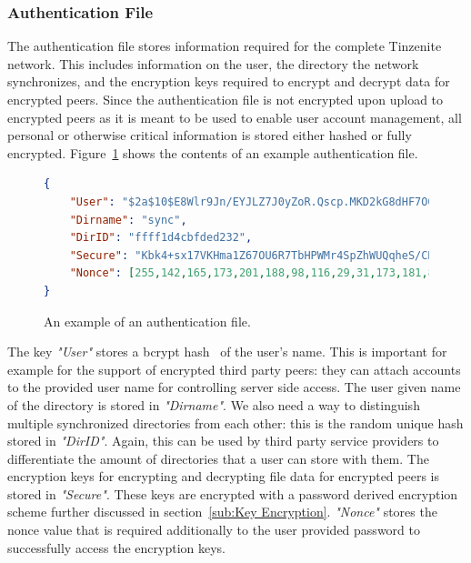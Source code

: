 \subsubsection{Authentication File}
\label{subs:Authentication File}

The authentication file stores information required for the complete Tinzenite network.
This includes information on the user, the directory the network synchronizes, and the encryption keys required to encrypt and decrypt data for encrypted peers.
Since the authentication file is not encrypted upon upload to encrypted peers as it is meant to be used to enable user account management, all personal or otherwise critical information is stored either hashed or fully encrypted.
Figure~\ref{json:auth_object} shows the contents of an example authentication file.

\begin{figure}[htp]
    \begin{lstlisting}[language=json,firstnumber=0]
{
    "User": "$2a$10$E8Wlr9Jn/EYJLZ7J0yZoR.Qscp.MKD2kG8dHF7OQWYNA1mCfp.Qqe",
    "Dirname": "sync",
    "DirID": "ffff1d4cbfded232",
    "Secure": "Kbk4+sx17VKHma1Z67OU6R7TbHPWMr4SpZhWUQqheS/CNcKKHVYjTTSv0rbF4qDAa0vwikigsm7wHhy4iGjWB84i0ErO7rNwhqrPPxudeDM=",
    "Nonce": [255,142,165,173,201,188,98,116,29,31,173,181,84,84,137,54,159,50,193,248,51,162,76,195]
}
    \end{lstlisting}
\caption[Authentication JSON Object]{An example of an authentication file.}
\label{json:auth_object}
\end{figure}

The key \textit{"User"} stores a bcrypt hash~\cite{provos1999future} of the user's name.
This is important for example for the support of encrypted third party peers: they can attach accounts to the provided user name for controlling server side access.
The user given name of the directory is stored in \textit{"Dirname"}.
We also need a way to distinguish multiple synchronized directories from each other: this is the random unique hash stored in \textit{"DirID"}.
Again, this can be used by third party service providers to differentiate the amount of directories that a user can store with them.
The encryption keys for encrypting and decrypting file data for encrypted peers is stored in \textit{"Secure"}.
These keys are encrypted with a password derived encryption scheme further discussed in section~\ref{sub:Key Encryption}.
\textit{"Nonce"} stores the nonce value that is required additionally to the user provided password to successfully access the encryption keys.


